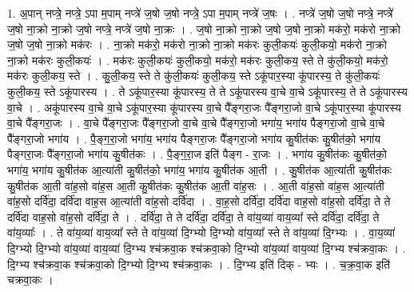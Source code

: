 \documentclass[17pt]{extarticle}
\begin{document}
1. अ॒पान् नप्त्रे॒ नप्त्रे॒ ऽपा म॒पाम् नप्त्रे॑ ज॒षो ज॒षो नप्त्रे॒ ऽपा म॒पाम् नप्त्रे॑ ज॒षः । . नप्त्रे॑ ज॒षो ज॒षो नप्त्रे॒ नप्त्रे॑ ज॒षो ना॒क्रो ना॒क्रो ज॒षो नप्त्रे॒ नप्त्रे॑ ज॒षो ना॒क्रः । . ज॒षो ना॒क्रो ना॒क्रो ज॒षो ज॒षो ना॒क्रो मक॑रो॒ मक॑रो ना॒क्रो ज॒षो ज॒षो ना॒क्रो मक॑रः । . ना॒क्रो मक॑रो॒ मक॑रो ना॒क्रो ना॒क्रो मक॑रः कुली॒कयः॑ कुली॒कयो॒ मक॑रो ना॒क्रो ना॒क्रो मक॑रः कुली॒कयः॑ । . मक॑रः कुली॒कयः॑ कुली॒कयो॒ मक॑रो॒ मक॑रः कुली॒कय॒ स्ते ते कु॑ली॒कयो॒ मक॑रो॒ मक॑रः कुली॒कय॒ स्ते । . कु॒ली॒कय॒ स्ते ते कु॑ली॒कयः॑ कुली॒कय॒ स्ते ऽकू॑पार॒स्या कू॑पारस्य॒ ते कु॑ली॒कयः॑ कुली॒कय॒ स्ते ऽकू॑पारस्य । . ते ऽकू॑पार॒स्या कू॑पारस्य॒ ते ते ऽकू॑पारस्य वा॒चे वा॒चे ऽकू॑पारस्य॒ ते ते ऽकू॑पारस्य वा॒चे । . अकू॑पारस्य वा॒चे वा॒चे ऽकू॑पार॒स्या कू॑पारस्य वा॒चे पै᳚ङ्गरा॒जः पै᳚ङ्गरा॒जो वा॒चे ऽकू॑पार॒स्या कू॑पारस्य वा॒चे पै᳚ङ्गरा॒जः । . वा॒चे पै᳚ङ्गरा॒जः पै᳚ङ्गरा॒जो वा॒चे वा॒चे पै᳚ङ्गरा॒जो भगा॑य॒ भगा॑य पैङ्गरा॒जो वा॒चे वा॒चे पै᳚ङ्गरा॒जो भगा॑य । . पै॒ङ्ग॒रा॒जो भगा॑य॒ भगा॑य पैङ्गरा॒जः पै᳚ङ्गरा॒जो भगा॑य कु॒षीत॑कः कु॒षीत॑को॒ भगा॑य पैङ्गरा॒जः पै᳚ङ्गरा॒जो भगा॑य कु॒षीत॑कः । . पै॒ङ्ग॒रा॒ज इति॑ पैङ्ग - रा॒जः । . भगा॑य कु॒षीत॑कः कु॒षीत॑को॒ भगा॑य॒ भगा॑य कु॒षीत॑क आ॒त्या॑ती कु॒षीत॑को॒ भगा॑य॒ भगा॑य कु॒षीत॑क आ॒ती । . कु॒षीत॑क आ॒त्या॑ती कु॒षीत॑कः कु॒षीत॑क आ॒ती वा॑ह॒सो वा॑ह॒स आ॒ती कु॒षीत॑कः कु॒षीत॑क आ॒ती वा॑ह॒सः । . आ॒ती वा॑ह॒सो वा॑ह॒स आ॒त्या॑ती वा॑ह॒सो दर्वि॑दा॒ दर्वि॑दा वाह॒स आ॒त्या॑ती वा॑ह॒सो दर्वि॑दा । . वा॒ह॒सो दर्वि॑दा॒ दर्वि॑दा वाह॒सो वा॑ह॒सो दर्वि॑दा॒ ते ते दर्वि॑दा वाह॒सो वा॑ह॒सो दर्वि॑दा॒ ते । . दर्वि॑दा॒ ते ते दर्वि॑दा॒ दर्वि॑दा॒ ते वा॑य॒व्या॑ वाय॒व्या᳚ स्ते दर्वि॑दा॒ दर्वि॑दा॒ ते वा॑य॒व्याः᳚ । . ते वा॑य॒व्या॑ वाय॒व्या᳚ स्ते ते वा॑य॒व्या॑ दि॒ग्भ्यो दि॒ग्भ्यो वा॑य॒व्या᳚ स्ते ते वा॑य॒व्या॑ दि॒ग्भ्यः । . वा॒य॒व्या॑ दि॒ग्भ्यो दि॒ग्भ्यो वा॑य॒व्या॑ वाय॒व्या॑ दि॒ग्भ्य श्च॑क्रवा॒क श्च॑क्रवा॒को दि॒ग्भ्यो वा॑य॒व्या॑ वाय॒व्या॑ दि॒ग्भ्य श्च॑क्रवा॒कः । . दि॒ग्भ्य श्च॑क्रवा॒क श्च॑क्रवा॒को दि॒ग्भ्यो दि॒ग्भ्य श्च॑क्रवा॒कः । . दि॒ग्भ्य इति॑ दिक् - भ्यः । . च॒क्र॒वा॒क इति॑ चक्रवा॒कः । \newline
\pagebreak
{}
\end{document}
